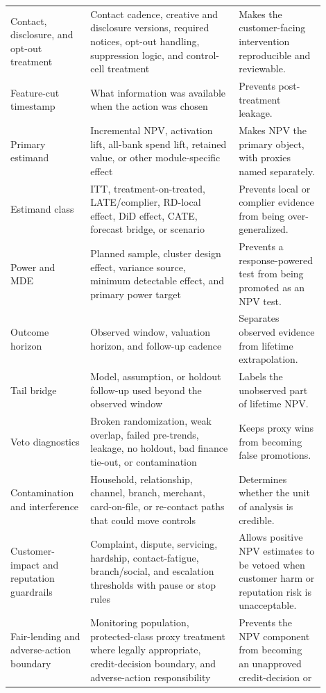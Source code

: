 \documentclass[11pt]{article}
\newcommand{\1}{\mathbf{1}}
\begin{document}
\begin{longtable}{L{0.22\linewidth}L{0.43\linewidth}L{0.25\linewidth}}
Contact, disclosure, and opt-out treatment
  & Contact cadence, creative and disclosure versions, required notices,
    opt-out handling, suppression logic, and control-cell treatment
  & Makes the customer-facing intervention reproducible and reviewable. \\
Feature-cut timestamp
  & What information was available when the action was chosen
  & Prevents post-treatment leakage. \\
Primary estimand
  & Incremental NPV, activation lift, all-bank spend lift, retained value,
    or other module-specific effect
  & Makes NPV the primary object, with proxies named separately. \\
Estimand class
  & ITT, treatment-on-treated, LATE/complier, RD-local effect, DiD effect,
    CATE, forecast bridge, or scenario
  & Prevents local or complier evidence from being over-generalized. \\
Power and MDE
  & Planned sample, cluster design effect, variance source, minimum detectable
    effect, and primary power target
  & Prevents a response-powered test from being promoted as an NPV test. \\
Outcome horizon
  & Observed window, valuation horizon, and follow-up cadence
  & Separates observed evidence from lifetime extrapolation. \\
Tail bridge
  & Model, assumption, or holdout follow-up used beyond the observed window
  & Labels the unobserved part of lifetime NPV. \\
Veto diagnostics
  & Broken randomization, weak overlap, failed pre-trends, leakage, no holdout,
    bad finance tie-out, or contamination
  & Keeps proxy wins from becoming false promotions. \\
Contamination and interference
  & Household, relationship, channel, branch, merchant, card-on-file, or
    re-contact paths that could move controls
  & Determines whether the unit of analysis is credible. \\
Customer-impact and reputation guardrails
  & Complaint, dispute, servicing, hardship, contact-fatigue, branch/social,
    and escalation thresholds with pause or stop rules
  & Allows positive NPV estimates to be vetoed when customer harm or reputation
    risk is unacceptable. \\
Fair-lending and adverse-action boundary
  & Monitoring population, protected-class proxy treatment where legally
    appropriate, credit-decision boundary, and adverse-action responsibility
  & Prevents the NPV component from becoming an unapproved credit-decision or

\end{longtable}
\end{document}
